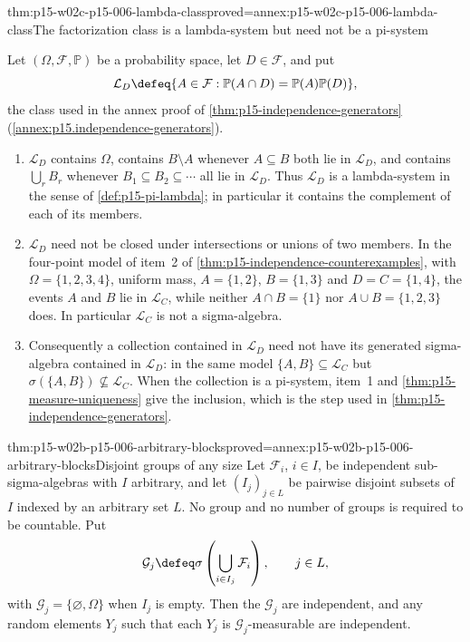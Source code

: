 \begin{hblemma}{thm:p15-w02c-p15-006-lambda-class}{proved=annex:p15-w02c-p15-006-lambda-class}{The factorization class is a lambda-system but need not be a pi-system}
\par\nobreak
Let \((\Omega,\mathcal F,\mathbb P)\) be a probability space, let
\(D\in\mathcal F\), and put
\[
 \mathcal L_D\defeq\{A\in\mathcal F:
          \mathbb P(A\cap D)=\mathbb P(A)\mathbb P(D)\},
\]
the class used in the annex proof of
\cref{thm:p15-independence-generators}
(\cref{annex:p15.independence-generators}).
\begin{enumerate}
\item \(\mathcal L_D\) contains \(\Omega\), contains \(B\setminus A\)
      whenever \(A\subseteq B\) both lie in \(\mathcal L_D\), and
      contains \(\bigcup_r B_r\) whenever \(B_1\subseteq B_2\subseteq\cdots\)
      all lie in \(\mathcal L_D\). Thus \(\mathcal L_D\) is a
      lambda-system in the sense of \cref{def:p15-pi-lambda}; in
      particular it contains the complement of each of its members.
\item \(\mathcal L_D\) need not be closed under intersections or unions
      of two members. In the four-point model of item~2 of
      \cref{thm:p15-independence-counterexamples}, with
      \(\Omega=\{1,2,3,4\}\), uniform mass, \(A=\{1,2\}\),
      \(B=\{1,3\}\) and \(D=C=\{1,4\}\), the events \(A\) and \(B\)
      lie in \(\mathcal L_C\), while neither \(A\cap B=\{1\}\) nor
      \(A\cup B=\{1,2,3\}\) does. In particular \(\mathcal L_C\) is not
      a sigma-algebra.
\item Consequently a collection contained in \(\mathcal L_D\) need not
      have its generated sigma-algebra contained in \(\mathcal L_D\):
      in the same model \(\{A,B\}\subseteq\mathcal L_C\) but
      \(\sigma(\{A,B\})\not\subseteq\mathcal L_C\). When the collection
      is a pi-system, item~1 and \cref{thm:p15-measure-uniqueness}
      give the inclusion, which is the step used in
      \cref{thm:p15-independence-generators}.
\end{enumerate}
\end{hblemma}

\begin{hbtheorem}{thm:p15-w02b-p15-006-arbitrary-blocks}{proved=annex:p15-w02b-p15-006-arbitrary-blocks}{Disjoint groups of any size}
Let \(\mathcal F_i\), \(i\in I\), be independent sub-sigma-algebras
with \(I\) arbitrary, and let \((I_j)_{j\in L}\) be pairwise disjoint
subsets of \(I\) indexed by an arbitrary set \(L\). No group and no
number of groups is required to be countable. Put
\[
 \mathcal G_j\defeq\sigma\left(\bigcup_{i\in I_j}\mathcal F_i\right),
 \qquad j\in L,
\]
with \(\mathcal G_j=\{\varnothing,\Omega\}\) when \(I_j\) is empty.
Then the \(\mathcal G_j\) are independent, and any random elements
\(Y_j\) such that each \(Y_j\) is \(\mathcal G_j\)-measurable are
independent.
\end{hbtheorem}

